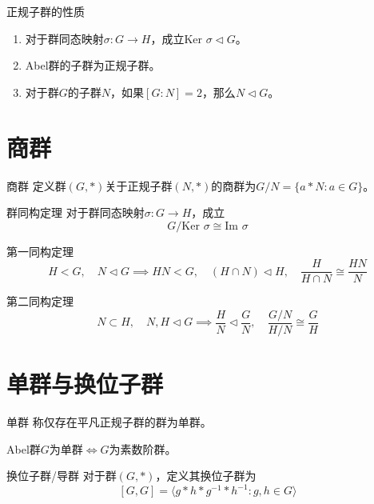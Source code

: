 \documentclass[lang = cn, scheme = chinese, thmcnt = section]{elegantbook}
\newcommand{\rang}{\rangle}            %
\begin{document}
\begin{proposition}{正规子群的性质}
	\begin{enumerate}
		\item 对于群同态映射$\sigma:G\to H$，成立$\text{Ker }\sigma\triangleleft G$。
		\item Abel群的子群为正规子群。
		\item 对于群$G$的子群$N$，如果$[G:N]=2$，那么$N\triangleleft G$。
	\end{enumerate}
\end{proposition}

\section{商群}

\begin{definition}{商群}
	定义群$(G,*)$关于正规子群$(N,*)$的商群为$G/N=\{ a*N:a\in G \}$。
\end{definition}

\begin{theorem}{群同构定理}
	对于群同态映射$\sigma:G\to H$，成立
	$$
	G/\text{Ker }\sigma\cong\text{Im }\sigma
	$$
\end{theorem}

\begin{theorem}{第一同构定理}
	$$
	H<G,\quad N\triangleleft G\implies HN<G,\quad (H\cap N)\triangleleft H,\quad \frac{H}{H\cap N}\cong \frac{HN}{N}
	$$
\end{theorem}

\begin{theorem}{第二同构定理}
	$$
	N\subset H,\quad N,H\triangleleft G \implies \frac{H}{N}\triangleleft\frac{G}{N},\quad 
	\frac{G/N}{H/N}\cong\frac{G}{H}
	$$
\end{theorem}

\section{单群与换位子群}

\begin{definition}{单群}
	称仅存在平凡正规子群的群为单群。
\end{definition}

\begin{proposition}
	Abel群$G$为单群$\iff G$为素数阶群。
\end{proposition}

\begin{definition}{换位子群/导群}
	对于群$(G,*)$，定义其换位子群为
	$$
	[G,G]=\langle g*h*g^{-1}*h^{-1}:g,h\in G \rang
	$$
\end{definition}
\end{document}
